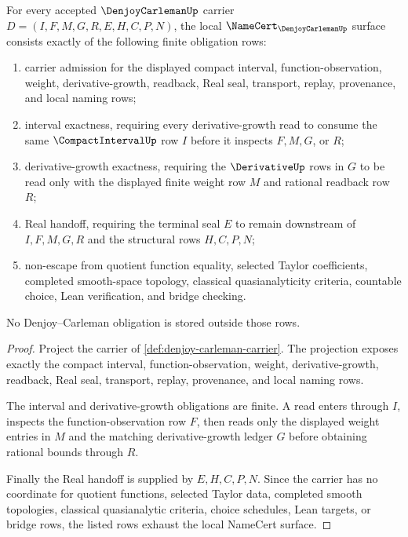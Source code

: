 \begin{theorem}
\label{thm:denjoy-carleman-namecert-obligations}
For every accepted $\DenjoyCarlemanUp$ carrier $D=(I,F,M,G,R,E,H,C,P,N)$, the local $\NameCert_{\DenjoyCarlemanUp}$ surface consists exactly of the following finite obligation rows:
\begin{enumerate}
\item carrier admission for the displayed compact interval, function-observation, weight, derivative-growth, readback, Real seal, transport, replay, provenance, and local naming rows;
\item interval exactness, requiring every derivative-growth read to consume the same $\CompactIntervalUp$ row $I$ before it inspects $F,M,G$, or $R$;
\item derivative-growth exactness, requiring the $\DerivativeUp$ rows in $G$ to be read only with the displayed finite weight row $M$ and rational readback row $R$;
\item Real handoff, requiring the terminal seal $E$ to remain downstream of $I,F,M,G,R$ and the structural rows $H,C,P,N$;
\item non-escape from quotient function equality, selected Taylor coefficients, completed smooth-space topology, classical quasianalyticity criteria, countable choice, Lean verification, and bridge checking.
\end{enumerate}
No Denjoy--Carleman obligation is stored outside those rows.
\end{theorem}
\begin{proof}
Project the carrier of \autoref{def:denjoy-carleman-carrier}. The projection exposes exactly the compact interval, function-observation, weight, derivative-growth, readback, Real seal, transport, replay, provenance, and local naming rows.

The interval and derivative-growth obligations are finite. A read enters through $I$, inspects the function-observation row $F$, then reads only the displayed weight entries in $M$ and the matching derivative-growth ledger $G$ before obtaining rational bounds through $R$.

Finally the Real handoff is supplied by $E,H,C,P,N$. Since the carrier has no coordinate for quotient functions, selected Taylor data, completed smooth topologies, classical quasianalytic criteria, choice schedules, Lean targets, or bridge rows, the listed rows exhaust the local NameCert surface.
\end{proof}

